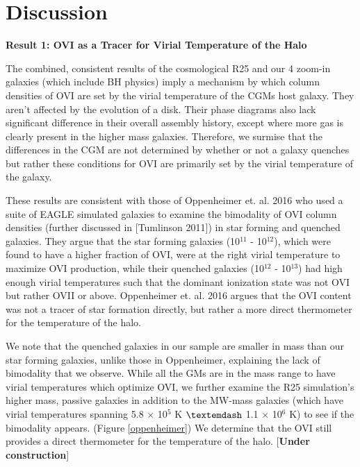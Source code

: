 \documentclass[]{emulateapj}
\begin{document}

\section{Discussion} \label{Discuss}

\textbf{Result 1: OVI as a Tracer for Virial Temperature of the Halo}

The combined, consistent results of the cosmological R25 and our 4 zoom-in galaxies (which include BH physics) imply a mechanism by which column densities of OVI are set by the virial temperature of the CGMs host galaxy. They aren't affected by the evolution of a disk. Their phase diagrams also lack significant difference in their overall assembly history, except where more gas is clearly present in the higher mass galaxies. Therefore, we surmise that the differences in the CGM are not determined by whether or not a galaxy quenches but rather these conditions for OVI are primarily set by the virial temperature of the galaxy. 

These results are consistent with those of Oppenheimer et. al. 2016 who used a suite of EAGLE simulated galaxies to examine the bimodality of OVI column densities (further discussed in [Tumlinson 2011]) in star forming and quenched galaxies. They argue that the star forming galaxies (10$^{11}$ - 10$^{12}$), which were found to have a higher fraction of OVI, were at the right virial temperature to maximize OVI production, while their quenched galaxies (10$^{12}$ - 10$^{13}$) had high enough virial temperatures such that the dominant ionization state was not OVI but rather OVII or above. Oppenheimer et. al. 2016 argues that the OVI content was not a tracer of star formation directly, but rather a more direct thermometer for the temperature of the halo.

We note that the quenched galaxies in our sample are smaller in mass than our star forming galaxies, unlike those in Oppenheimer, explaining the lack of bimodality that we observe. While all the GMs are in the mass range to have virial temperatures which optimize OVI, we further examine the R25 simulation's higher mass, passive galaxies in addition to the MW-mass galaxies (which have virial temperatures spanning 5.8 $\times$ 10$^{5}$ K $\textemdash$ 1.1 $\times$ 10$^{6}$ K) to see if the bimodality appears. (Figure \ref{oppenheimer}) We determine that the OVI still provides a direct thermometer for the temperature of the halo. [\textbf{Under construction}]
\end{document}
